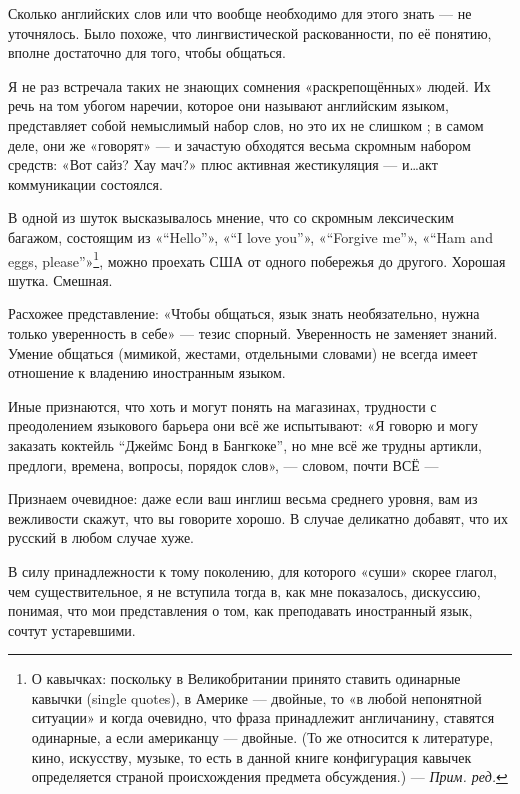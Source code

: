 Сколько английских слов или что вообще необходимо для этого знать --- не уточнялось. Было похоже, что лингвистической раскованности, по её понятию, вполне достаточно для того, чтобы общаться.

Я не раз встречала таких не знающих сомнения «раскрепощённых» людей. Их речь на том убогом наречии, которое они называют английским языком, представляет собой немыслимый набор слов, но это их не слишком ; в самом деле, они же «говорят» --- и зачастую обходятся весьма скромным набором средств: «Вот сайз? Хау мач?» плюс активная жестикуляция --- и\dots акт коммуникации состоялся.

В одной из шуток высказывалось мнение, что со скромным лексическим багажом, состоящим из «``Hello''», «``I love you''», «``Forgive me''», «``Ham and eggs, please''»\footnote{%
    О кавычках: поскольку в Великобритании принято ставить одинарные кавычки (single quotes), в Америке --- двойные, то «в любой непонятной ситуации» и когда очевидно, что фраза принадлежит англичанину, ставятся одинарные, а если американцу --- двойные. (То же относится к литературе, кино, искусству, музыке, то есть в данной книге конфигурация кавычек определяется страной происхождения предмета обсуждения.) --- \textit{Прим. ред.}
}, можно проехать США от одного побережья до другого. Хорошая шутка. Смешная.

Расхожее представление: «Чтобы общаться, язык знать необязательно, нужна только уверенность в себе» --- тезис спорный. Уверенность не заменяет знаний. Умение общаться (мимикой, жестами, отдельными словами) не всегда имеет отношение к владению иностранным языком.

Иные признаются, что хоть и могут понять  на магазинах, трудности с преодолением языкового барьера они всё же испытывают: «Я говорю и могу заказать коктейль ``Джеймс Бонд в Бангкоке'', но мне всё же трудны артикли, предлоги, времена, вопросы, порядок слов», --- словом, почти ВСЁ ---

Признаем очевидное: даже если ваш инглиш весьма среднего уровня, вам из вежливости скажут, что вы говорите хорошо. В случае  деликатно добавят, что их русский в любом случае хуже.

В силу принадлежности к тому поколению, для которого «суши» скорее глагол, чем существительное, я не вступила тогда в, как мне показалось,  дискуссию, понимая, что мои представления о том, как преподавать иностранный язык, сочтут  устаревшими.

